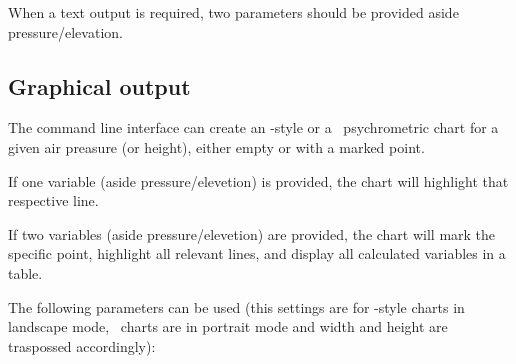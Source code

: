 \documentclass[letterpaper]{article}
\begin{document}
When a text output is required, two parameters should be provided aside
pressure/elevation.

\subsection{Graphical output}
The command line interface can create an \ashrae-style or a \mollier\ 
psychrometric chart for a given air preasure (or height), either empty
or with a marked point.

If one variable (aside pressure/elevetion) is provided, the chart will
highlight that respective line.

If two variables (aside pressure/elevetion) are provided, the chart will
mark the specific point, highlight all relevant lines,
and display all calculated variables in a table.

The following parameters can be used (this settings are for
\ashrae-style charts in landscape mode, \mollier\ charts are in portrait
mode and width and height are traspossed accordingly):
\end{document}
